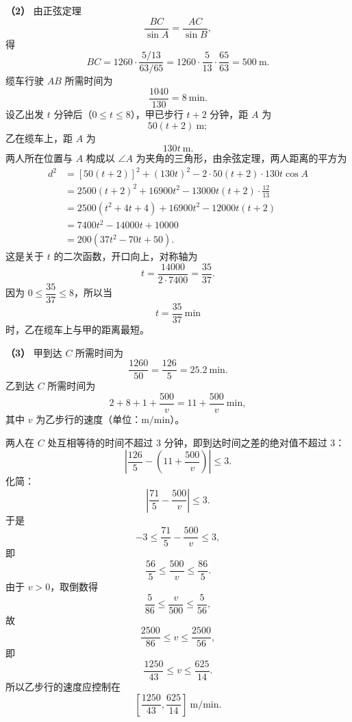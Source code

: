 \begin{answer}
\textbf{（2）} 由正弦定理
\nopagebreak[4]
\[\frac{BC}{\sin A}=\frac{AC}{\sin B},\]
得
\nopagebreak[4]
\[BC=1260\cdot\frac{5/13}{63/65}
=1260\cdot\frac5{13}\cdot\frac{65}{63}
=500\ \mathrm m.\]
缆车行驶 $AB$ 所需时间为
\nopagebreak[4]
\[\frac{1040}{130}=8\ \mathrm{min}.\]
设乙出发 $t$ 分钟后（$0\leqslant t\leqslant8$），甲已步行 $t+2$ 分钟，距 $A$ 为
\nopagebreak[4]
\[50(t+2)\ \mathrm m;\]
乙在缆车上，距 $A$ 为
\nopagebreak[4]
\[130t\ \mathrm m.\]
两人所在位置与 $A$ 构成以 $\angle A$ 为夹角的三角形，由余弦定理，两人距离的平方为
\nopagebreak[4]
\[\begin{aligned}
d^2&=[50(t+2)]^2+(130t)^2
-2\cdot50(t+2)\cdot130t\cos A\\
&=2500(t+2)^2+16900t^2
-13000t(t+2)\cdot\frac{12}{13}\\
&=2500(t^2+4t+4)+16900t^2-12000t(t+2)\\
&=7400t^2-14000t+10000\\
&=200(37t^2-70t+50).
\end{aligned}\]
这是关于 $t$ 的二次函数，开口向上，对称轴为
\nopagebreak[4]
\[t=\frac{14000}{2\cdot7400}=\frac{35}{37}.\]
因为 $0\leqslant\dfrac{35}{37}\leqslant8$，所以当
\nopagebreak[4]
\[t=\frac{35}{37}\ \mathrm{min}\]
时，乙在缆车上与甲的距离最短。

\textbf{（3）} 甲到达 $C$ 所需时间为
\nopagebreak[4]
\[\frac{1260}{50}=\frac{126}{5}=25.2\ \mathrm{min}.\]
乙到达 $C$ 所需时间为
\nopagebreak[4]
\[2+8+1+\frac{500}{v}=11+\frac{500}{v}\ \mathrm{min},\]
其中 $v$ 为乙步行的速度（单位：$\mathrm{m/min}$）。

两人在 $C$ 处互相等待的时间不超过 $3$ 分钟，即到达时间之差的绝对值不超过 $3$：
\nopagebreak[4]
\[\left|\frac{126}{5}-\left(11+\frac{500}{v}\right)\right|\leqslant3.\]
化简：
\nopagebreak[4]
\[\left|\frac{71}{5}-\frac{500}{v}\right|\leqslant3.\]
于是
\nopagebreak[4]
\[-3\leqslant\frac{71}{5}-\frac{500}{v}\leqslant3,\]
即
\nopagebreak[4]
\[\frac{56}{5}\leqslant\frac{500}{v}\leqslant\frac{86}{5}.\]
由于 $v>0$，取倒数得
\nopagebreak[4]
\[\frac{5}{86}\leqslant\frac{v}{500}\leqslant\frac{5}{56},\]
故
\nopagebreak[4]
\[\frac{2500}{86}\leqslant v\leqslant\frac{2500}{56},\]
即
\nopagebreak[4]
\[\frac{1250}{43}\leqslant v\leqslant\frac{625}{14}.\]
所以乙步行的速度应控制在
\nopagebreak[4]
\[\left[\frac{1250}{43},\frac{625}{14}\right]\ \mathrm{m/min}.\]


\end{answer}
